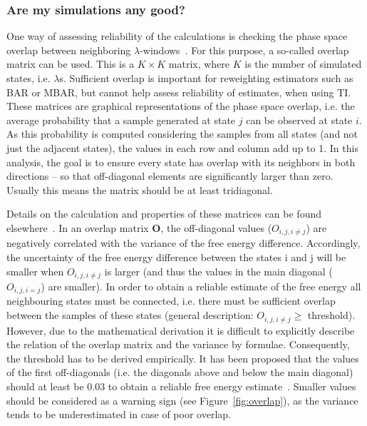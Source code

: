 \documentclass[9pt,bestpractices]{livecoms}
\begin{document}
\subsubsection{Are my simulations any good?}
\label{sec:are-they-good}
One way of assessing reliability of the calculations is checking the phase space overlap between neighboring $\lambda$-windows~\cite{wu2005phasespace,wu2005phasespacea}. For this purpose, a so-called overlap matrix can be used. This is a $K\times K$ matrix, where $K$ is the number of simulated states, i.e. $\lambda$s. Sufficient overlap is important for reweighting estimators such as BAR or MBAR, but cannot help assess reliability of estimates, when using TI. 
These matrices are graphical representations of the phase space overlap, i.e. the average probability that a sample generated at state $j$ can be observed at state $i$. As this probability is computed considering the samples from all states (and not just the adjacent states), the values in each row and column add up to 1. In this analysis, the goal is to ensure every state has overlap with its neighbors in both directions -- so that off-diagonal elements are significantly larger than zero. Usually this means the matrix should be at least tridiagonal.

Details on the calculation and properties of these matrices can be found elsewhere~\cite{klimovich2015guidelines}.
In an overlap matrix $\mathbf{O}$, the off-diagonal values (${O}_{i,j,i\ne j}$) are negatively correlated with the variance of the free energy difference. Accordingly, the uncertainty of the free energy difference between the states i and j will be smaller when ${O}_{i,j,i\ne j}$ is larger (and thus the values in the main diagonal (${O}_{i,j,i=j}$) are smaller). In order to obtain a reliable estimate of the free energy all neighbouring states must be connected, i.e. there must be sufficient overlap between the samples of these states (general description: ${O}_{i,j,i\ne j}\ge$ threshold).
However, due to the mathematical derivation it is difficult to explicitly describe the relation of the overlap matrix and the variance by formulae. Consequently, the threshold has to be derived empirically. It has been proposed that the values of the first off-diagonals (i.e. the diagonals above and below the main diagonal) should at least be 0.03 to obtain a reliable free energy estimate~\cite{klimovich2015guidelines}. Smaller values should be considered as a warning sign (see Figure~\ref{fig:overlap}), as the variance tends to be underestimated in case of poor overlap.
\end{document}
